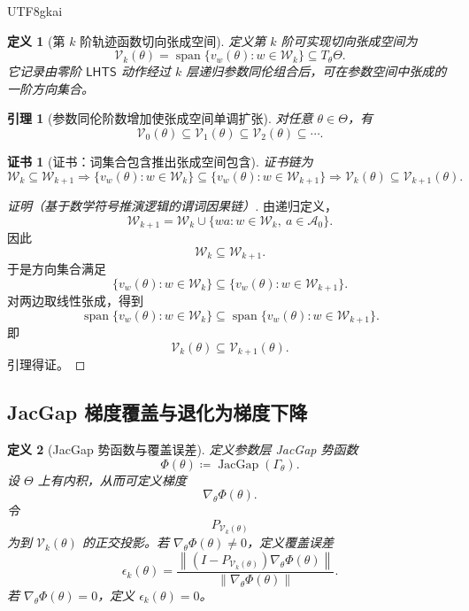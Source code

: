 \documentclass[12pt]{article}
\newtheorem{definition}{定义}[section]
\newtheorem{lemma}{引理}[section]
\newtheorem{Certificate}{证书}[section]
\newcommand{\LHTS}{\ensuremath{\mathsf{LHTS}}}
\newcommand{\DefEq}{\coloneqq}
\DeclareMathOperator{\JacGap}{JacGap}
\DeclareMathOperator{\Span}{span}
\begin{document}
\begin{CJK*}{UTF8}{gkai}
\begin{definition}[第 \(k\) 阶轨迹函数切向张成空间]
\label{def:tex57-span-space}
定义第 \(k\) 阶可实现切向张成空间为
\[
  \boxed{
  \mathcal V_k(\theta)
  =
  \Span
  \{v_w(\theta):w\in\mathcal W_k\}
  \subseteq
  T_\theta\Theta.
  }
\]
它记录由零阶 \(\LHTS{}\) 动作经过 \(k\) 层递归参数同伦组合后，可在参数空间中张成的
一阶方向集合。
\end{definition}

\begin{lemma}[参数同伦阶数增加使张成空间单调扩张]
\label{lem:tex57-span-monotone}
对任意 \(\theta\in\Theta\)，有
\[
  \boxed{
  \mathcal V_0(\theta)
  \subseteq
  \mathcal V_1(\theta)
  \subseteq
  \mathcal V_2(\theta)
  \subseteq
  \cdots.
  }
\]
\end{lemma}

\begin{Certificate}[证书：词集合包含推出张成空间包含]
\label{cert:tex57-span-monotone}
证书链为
\[
  \mathcal W_k\subseteq\mathcal W_{k+1}
  \Longrightarrow
  \{v_w(\theta):w\in\mathcal W_k\}
  \subseteq
  \{v_w(\theta):w\in\mathcal W_{k+1}\}
  \Longrightarrow
  \mathcal V_k(\theta)\subseteq\mathcal V_{k+1}(\theta).
\]
\end{Certificate}

\begin{proof}[证明（基于数学符号推演逻辑的谓词因果链）]
由递归定义，
\[
  \mathcal W_{k+1}
  =
  \mathcal W_k
  \cup
  \{wa:w\in\mathcal W_k,\ a\in\mathcal A_0\}.
\]
因此
\[
  \mathcal W_k\subseteq\mathcal W_{k+1}.
\]
于是方向集合满足
\[
  \{v_w(\theta):w\in\mathcal W_k\}
  \subseteq
  \{v_w(\theta):w\in\mathcal W_{k+1}\}.
\]
对两边取线性张成，得到
\[
  \Span\{v_w(\theta):w\in\mathcal W_k\}
  \subseteq
  \Span\{v_w(\theta):w\in\mathcal W_{k+1}\}.
\]
即
\[
  \mathcal V_k(\theta)\subseteq\mathcal V_{k+1}(\theta).
\]
引理得证。
\end{proof}

\subsection{JacGap 梯度覆盖与退化为梯度下降}
\label{subsec:tex57-jacgap-gradient-cover}

\begin{definition}[JacGap 势函数与覆盖误差]
\label{def:tex57-jacgap-cover-error}
定义参数层 JacGap 势函数
\[
  \Phi(\theta)
  \DefEq
  \JacGap(\Gamma_\theta).
\]
设 \(\Theta\) 上有内积，从而可定义梯度
\[
  \nabla_\theta\Phi(\theta).
\]
令
\[
  P_{\mathcal V_k(\theta)}
\]
为到 \(\mathcal V_k(\theta)\) 的正交投影。若
\(\nabla_\theta\Phi(\theta)\neq0\)，定义覆盖误差
\[
  \epsilon_k(\theta)
  =
  \frac{
  \left\|
  (I-P_{\mathcal V_k(\theta)})
  \nabla_\theta\Phi(\theta)
  \right\|
  }{
  \|\nabla_\theta\Phi(\theta)\|
  }.
\]
若 \(\nabla_\theta\Phi(\theta)=0\)，定义 \(\epsilon_k(\theta)=0\)。
\end{definition}


\end{CJK*}
\end{document}
